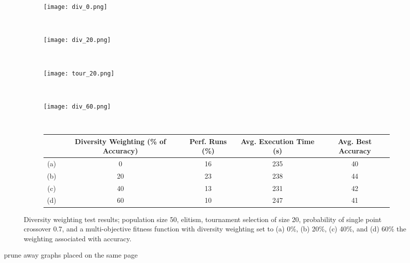 \begin{figure}
	\centering
	\begin{subfigure}[ht]{0.49\textwidth}
		\texttt{[image: div\_0.png]}
		\caption{}
		\label{fig:div_0}
		\vspace{1em}
	\end{subfigure}
	~
	\begin{subfigure}[ht]{0.49\textwidth}
		\texttt{[image: div\_20.png]}
		\caption{}
		\vspace{1em}
		\label{fig:div_2}
	\end{subfigure}
	~
	\begin{subfigure}[ht]{0.49\textwidth}
		\texttt{[image: tour\_20.png]}
		\caption{}
		\vspace{1em}
	\end{subfigure}
	~
	\begin{subfigure}[ht]{0.49\textwidth}
		\texttt{[image: div\_60.png]}
		\caption{}
		\vspace{1em}
		\label{fig:div_6}
	\end{subfigure}
	~
	\begin{subfigure}[ht]{\textwidth}
		\centering
		\begin{tabular}{ccccc}
			\toprule
			& \bfseries{Diversity Weighting (\% of Accuracy)} &
			\bfseries{Perf. Runs (\%)} &
			\bfseries{Avg. Execution Time (s)} & \bfseries{Avg. Best Accuracy}\\
			\midrule
			(a) & 0 & 16 & 235 & 40\\
			(b) & 20 & 23 & 238 & 44\\
			(c) & 40 & 13 & 231 & 42\\
			(d) & 60 & 10 & 247 & 41\\
			\bottomrule
		\end{tabular}
	\end{subfigure}

	\caption[Diversity weighting test results]{Diversity weighting test results;
	population size 50, elitism, tournament selection of size 20, probability
	of single point crossover 0.7, and a multi-objective fitness function with
	diversity weighting set to (a) 0\%, (b) 20\%, (c) 40\%, and (d) 60\% the weighting
	associated with accuracy.}
	\label{fig:div}
\end{figure}

\todo prune away graphs placed on the same page

